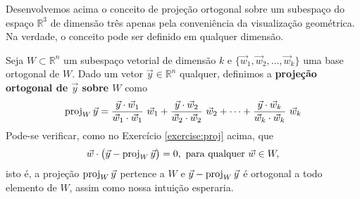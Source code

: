 \documentclass[../livro.tex]{subfiles}  %
\begin{document}
Desenvolvemos acima o conceito de projeção ortogonal sobre um subespaço do espaço $\mathbb{R}^3$ de dimensão três apenas pela conveniência da visualização geométrica. Na verdade, o conceito pode ser definido em qualquer dimensão.

Seja $W \subset \mathbb{R}^n$ um subespaço vetorial de dimensão $k$ e $\{\vec{w}_1, \vec{w}_2, \dots, \vec{w}_k \}$ uma base ortogonal de $W$. Dado um vetor $\vec{y} \in \mathbb{R}^n$ qualquer, definimos a \textbf{projeção ortogonal de $\vec{y}$ sobre $W$} como
\begin{equation}
\proj_W \vec{y}  = \frac{\vec{y} \cdot \vec{w}_1}{\vec{w}_1 \cdot \vec{w}_1} \ \vec{w}_1 + \frac{\vec{y} \cdot \vec{w}_2}{\vec{w}_2 \cdot \vec{w}_2} \ \vec{w}_2 + \cdots + \frac{\vec{y} \cdot \vec{w}_k}{\vec{w}_k \cdot \vec{w}_k} \ \vec{w}_k
\end{equation} Pode-se verificar, como no Exercício \ref{exercise:proj} acima, que
\begin{equation}
\vec{w} \cdot  \big( \vec{y} - \operatorname{proj}_W \vec{y} \big) = 0, \ \text{para qualquer } \vec{w} \in W,
\end{equation} isto é, a projeção $\operatorname{proj}_W \vec{y}$ pertence a $W$ e $\vec{y} - \operatorname{proj}_W \vec{y}$ é ortogonal a todo elemento de $W$, assim como nossa intuição esperaria.
\end{document}
